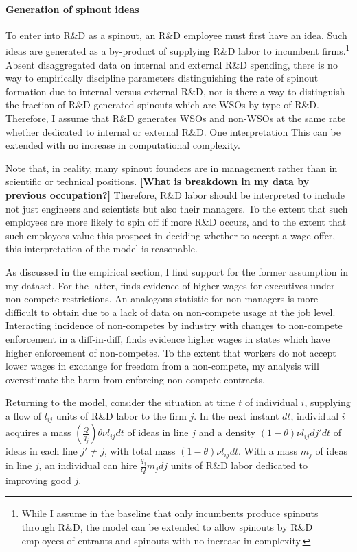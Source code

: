 \documentclass[11pt,english]{article}
\theoremstyle{remark}
\begin{document}
\paragraph{Generation of spinout ideas}

To enter into R\&D as a spinout, an R\&D employee must first have an idea. Such ideas are generated as a by-product of supplying R\&D labor to incumbent firms.\footnote{While I assume in the baseline that only incumbents produce spinouts through R\&D, the model can be extended to allow spinouts by R\&D employees of entrants and spinouts with no increase in complexity.} Absent disaggregated data on internal and external R\&D spending, there is no way to empirically discipline parameters distinguishing the rate of spinout formation due to internal versus external R\&D, nor is there a way to distinguish the fraction of R\&D-generated spinouts which are WSOs by type of R\&D. Therefore, I assume that R\&D generates WSOs and non-WSOs at the same rate whether dedicated to internal or external R\&D. One interpretation This can be extended with no increase in computational complexity. 

Note that, in reality, many spinout founders are in management rather than in scientific or technical positions. \textbf{[What is breakdown in my data by previous occupation?] }Therefore, R\&D labor should be interpreted to include not just engineers and scientists but also their managers. To the extent that such employees are more likely to spin off if more R\&D occurs, and to the extent that such employees value this prospect in deciding whether to accept a wage offer, this interpretation of the model is reasonable. 

As discussed in the empirical section, I find support for the former assumption in my dataset. For the latter, \cite{shi_restrictions_2018} finds evidence of higher wages for executives under non-compete restrictions. An analogous statistic for non-managers is more difficult to obtain due to a lack of data on non-compete usage at the job level. Interacting incidence of non-competes by industry with changes to non-compete enforcement in a diff-in-diff, \cite{starr_consider_2018} finds evidence higher wages in states which have higher enforcement of non-competes. To the extent that workers do not accept lower wages in exchange for freedom from a non-compete, my analysis will overestimate the harm from enforcing non-compete contracts. 

Returning to the model, consider the situation at time $t$ of individual $i$, supplying a flow of $l_{ij}$ units of R\&D labor to the firm $j$. In the next instant $dt$, individual $i$ acquires a mass $(\frac{Q}{q_j}) \theta \nu l_{ij} dt$ of ideas in line $j$ and a density $(1-\theta)\nu l_{ij} dj' dt$ of ideas in each line $j' \ne j$, with total mass $(1-\theta) \nu l_{ij} dt$. With a mass $m_j$ of ideas in line $j$, an individual can hire $\frac{q_j}{Q}m_jdj$ units of R\&D labor dedicated to improving good $j$.  
\end{document}
